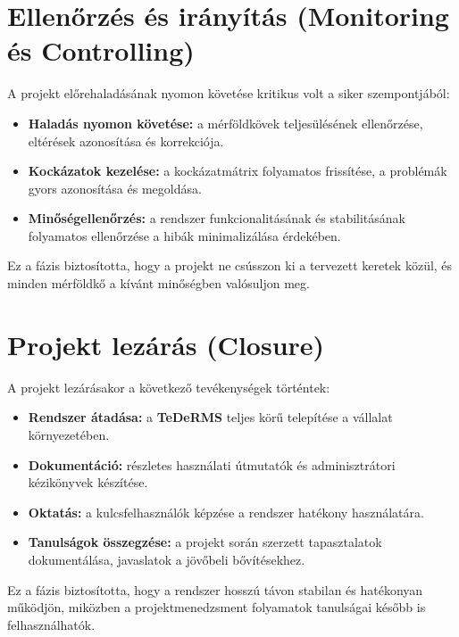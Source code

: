 \section{Ellenőrzés és irányítás (Monitoring és Controlling)}

A projekt előrehaladásának nyomon követése kritikus volt a siker szempontjából:
\begin{itemize}
    \item \textbf{Haladás nyomon követése:} a mérföldkövek teljesülésének ellenőrzése, eltérések azonosítása és korrekciója.
    \item \textbf{Kockázatok kezelése:} a kockázatmátrix folyamatos frissítése, a problémák gyors azonosítása és megoldása.
    \item \textbf{Minőségellenőrzés:} a rendszer funkcionalitásának és stabilitásának folyamatos ellenőrzése a hibák minimalizálása érdekében.
\end{itemize}

Ez a fázis biztosította, hogy a projekt ne csússzon ki a tervezett keretek közül, és minden mérföldkő a kívánt minőségben valósuljon meg.

\section{Projekt lezárás (Closure)}

A projekt lezárásakor a következő tevékenységek történtek:
\begin{itemize}
    \item \textbf{Rendszer átadása:} a \textbf{TeDeRMS} teljes körű telepítése a vállalat környezetében.
    \item \textbf{Dokumentáció:} részletes használati útmutatók és adminisztrátori kézikönyvek készítése.
    \item \textbf{Oktatás:} a kulcsfelhasználók képzése a rendszer hatékony használatára.
    \item \textbf{Tanulságok összegzése:} a projekt során szerzett tapasztalatok dokumentálása, javaslatok a jövőbeli bővítésekhez.
\end{itemize}

Ez a fázis biztosította, hogy a rendszer hosszú távon stabilan és hatékonyan működjön, 
miközben a projektmenedzsment folyamatok tanulságai később is felhasználhatók.
